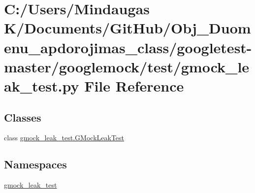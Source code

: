 \hypertarget{googletest-master_2googlemock_2test_2gmock__leak__test_8py}{}\section{C\+:/\+Users/\+Mindaugas K/\+Documents/\+Git\+Hub/\+Obj\+\_\+\+Duomenu\+\_\+apdorojimas\+\_\+class/googletest-\/master/googlemock/test/gmock\+\_\+leak\+\_\+test.py File Reference}
\label{googletest-master_2googlemock_2test_2gmock__leak__test_8py}
\subsection*{Classes}
\begin{DoxyCompactItemize}
\item 
class \mbox{\hyperlink{classgmock__leak__test_1_1_g_mock_leak_test}{gmock\+\_\+leak\+\_\+test.\+G\+Mock\+Leak\+Test}}
\end{DoxyCompactItemize}
\subsection*{Namespaces}
\begin{DoxyCompactItemize}
\item 
 \mbox{\hyperlink{namespacegmock__leak__test}{gmock\+\_\+leak\+\_\+test}}
\end{DoxyCompactItemize}
